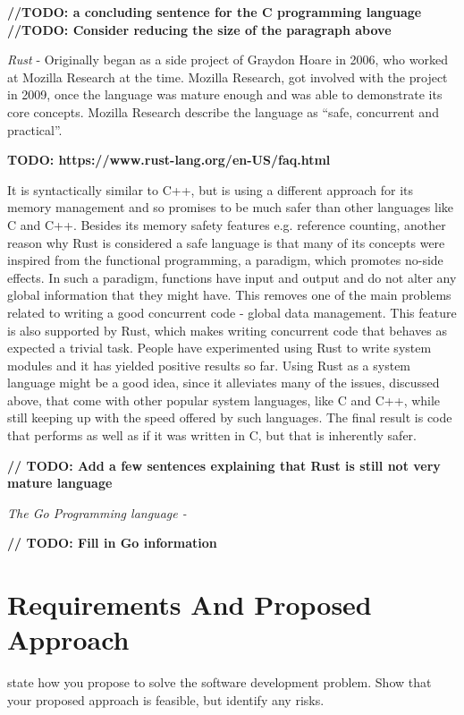 \documentclass{mprop}
\begin{document}
\textbf{//TODO: a concluding sentence for the C programming language
\linebreak
//TODO: Consider reducing the size of the paragraph above
}


\qquad \textit{Rust} - Originally began as a side project of  Graydon Hoare in 2006, who worked at Mozilla Research at the time. Mozilla Research, got involved with the project in 2009, once the language was mature enough and was able to demonstrate its core concepts. Mozilla Research describe the language as “safe, concurrent and practical”.

\textbf{TODO: https://www.rust-lang.org/en-US/faq.html}

\qquad It is syntactically similar to C++, but is using a different approach for its memory management and so promises to be much safer than other languages like C and C++. Besides its memory safety features e.g. reference counting, another reason why Rust is considered a safe language is that many of its concepts were inspired from the functional programming, a paradigm, which promotes no-side effects. In such a paradigm, functions have input and output and do not alter any global information that they might have. This removes one of the main problems related to writing a good concurrent code - global data management. This feature is also supported by Rust, which makes writing concurrent code that behaves as expected a trivial task. People have experimented using Rust to write system modules and it has yielded positive results so far. Using Rust as a system language might be a good idea, since it alleviates many of the issues, discussed above, that come with other popular system languages, like C and C++, while still keeping up with the speed offered by such languages. The final result is code that performs as well as if it was written in C, but that is inherently safer.

\textbf{// TODO: Add a few sentences explaining that Rust is still not very mature language}

\qquad \textit{The Go Programming language - }

\textbf{// TODO: Fill in Go information}

\pagebreak
\section{Requirements And Proposed Approach}

state how you propose to solve the software development problem. Show that your proposed approach is feasible, but identify any risks.
\end{document}
